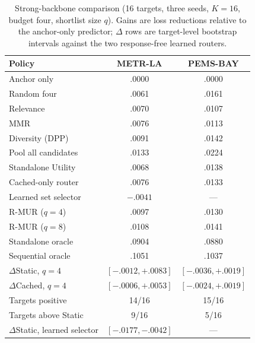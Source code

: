 \begin{table}[t]
 \centering
 \small
 \caption{Strong-backbone comparison (16 targets, three seeds, $K=16$, budget
 four, shortlist size $q$). Gains are loss reductions relative to the
 anchor-only predictor; $\Delta$ rows are target-level bootstrap intervals
 against the two response-free learned routers.}
 \label{tab:strong-backbone}
 \begin{tabular}{lcc}
  \toprule
  Policy & METR-LA & PEMS-BAY\\
  \midrule
  Anchor only & .0000 & .0000\\
  Random four & .0061 & .0161\\
  Relevance & .0070 & .0107\\
  MMR & .0076 & .0113\\
  Diversity (DPP) & .0091 & .0142\\
  Pool all candidates & .0133 & .0224\\
  Standalone Utility & .0068 & .0138\\
  Cached-only router & .0076 & .0133\\
  Learned set selector & $-.0041$ & ---\\
  R-MUR ($q=4$) & .0097 & .0130\\
  R-MUR ($q=8$) & .0108 & .0141\\
  Standalone oracle & .0904 & .0880\\
  Sequential oracle & .1051 & .1037\\
  \midrule
  $\Delta$Static, $q=4$ & $[-.0012,+.0083]$ & $[-.0036,+.0019]$\\
  $\Delta$Cached, $q=4$ & $[-.0006,+.0053]$ & $[-.0024,+.0019]$\\
  Targets positive & 14/16 & 15/16\\
  Targets above Static & 9/16 & 5/16\\
  $\Delta$Static, learned selector & $[-.0177,-.0042]$ & ---\\
  \bottomrule
 \end{tabular}
\end{table}

